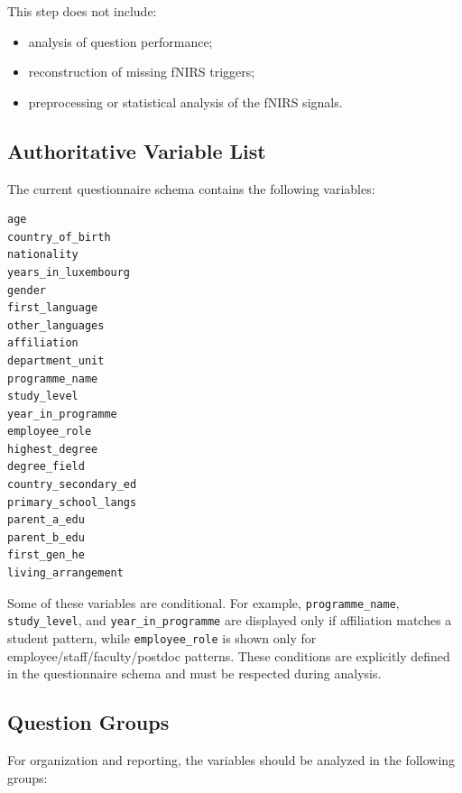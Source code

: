 \documentclass[11pt]{article}
\begin{document}
This step does not include:
\begin{itemize}
    \item analysis of question performance;
    \item reconstruction of missing fNIRS triggers;
    \item preprocessing or statistical analysis of the fNIRS signals.
\end{itemize}

\subsection{Authoritative Variable List}
The current questionnaire schema contains the following variables:
\begin{verbatim}
age
country_of_birth
nationality
years_in_luxembourg
gender
first_language
other_languages
affiliation
department_unit
programme_name
study_level
year_in_programme
employee_role
highest_degree
degree_field
country_secondary_ed
primary_school_langs
parent_a_edu
parent_b_edu
first_gen_he
living_arrangement
\end{verbatim}

Some of these variables are conditional.
For example, \texttt{programme\_name}, \texttt{study\_level}, and \texttt{year\_in\_programme}
are displayed only if affiliation matches a student pattern, while \texttt{employee\_role} is shown
only for employee/staff/faculty/postdoc patterns. These conditions are explicitly defined in the
questionnaire schema and must be respected during analysis. \cite{step1_demo_schema}

\subsection{Question Groups}
For organization and reporting, the variables should be analyzed in the following groups:
\end{document}
